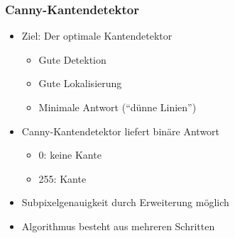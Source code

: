 \subsubsection{Canny-Kantendetektor}
\begin{itemize}
	\item Ziel: Der optimale Kantendetektor
	\begin{itemize}
		\item Gute Detektion
		\item Gute Lokalisierung
		\item Minimale Antwort ("`dünne Linien"')
	\end{itemize}
	\item Canny-Kantendetektor liefert binäre Antwort
	\begin{itemize}
		\item 0: keine Kante
		\item 255: Kante
	\end{itemize}
	\item Subpixelgenauigkeit durch Erweiterung möglich
	\item Algorithmus besteht aus mehreren Schritten
\end{itemize}
